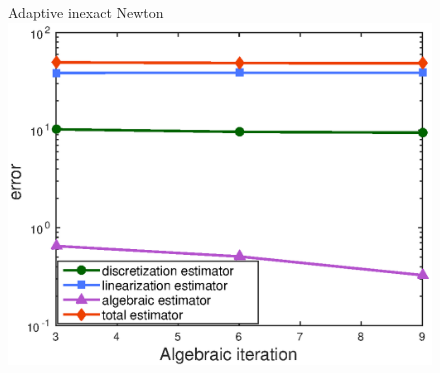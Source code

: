 \documentclass[10 pt]{beamer}
\begin{document}
\begin{frame}
\begin{figure}
\begin{minipage}[c]{.32\linewidth}
\end{minipage}\hfill
\begin{minipage}[c]{.33\linewidth}
   \centering
   Adaptive inexact Newton
\includegraphics[width=\textwidth]{fig_article/estimators_algebraic_iter_first_adaptive_inex_newton_step.eps}     
\end{minipage}
\end{figure}



\end{frame}
\end{document}
